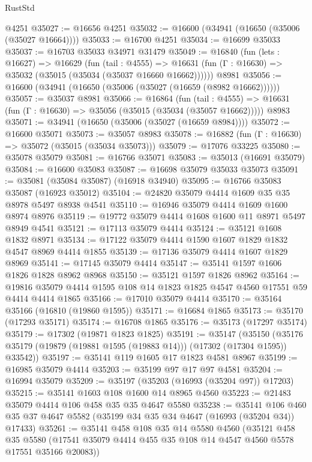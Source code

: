 \begin{lexlean}{RustStd}
\begin{coremodule}
{\begin{coremodule}
{{{{{{{{{{{{{{{{{{{{{{{{{{{{{{{{{{{{{{{{{{{{{{{{{{{{{{{    @4251
@35027 := @16656 @4251
@35032 := @16600 (@34941 (@16650 (@35006 (@35027 @16664))))
@35033 := @16700 @4251
@35034 := @16699 @35033
@35037 := @16703 @35033 @34971 @31479
@35049 := @16840
    (fun (lets : @16627) =>
    @16629
      (fun (tail : @4555) =>
      @16631 (fun (Γ : @16630) => @35032 (@35015 (@35034 (@35037 @16660 @16662))))))
    @8981
@35056 := @16600 (@34941 (@16650 (@35006 (@35027 (@16659 (@8982 @16662))))))
@35057 := @35037 @8981
@35066 := @16864
    (fun (tail : @4555) => @16631 (fun (Γ : @16630) => @35056 (@35015 (@35034 (@35057 @16662)))))
    @8983
@35071 := @34941 (@16650 (@35006 (@35027 (@16659 @8984))))
@35072 := @16600 @35071
@35073 := @35057 @8983
@35078 := @16882 (fun (Γ : @16630) => @35072 (@35015 (@35034 @35073)))
@35079 := @17076 @33225
@35080 := @35078 @35079
@35081 := @16766 @35071
@35083 := @35013 (@16691 @35079)
@35084 := @16600 @35083
@35087 := @16698 @35079 @35033 @35073
@35091 := @35081 (@35084 @35087) (@16918 @34940)
@35095 := @16766 @35083 @35087 (@16923 @35012)
@35104 := @24820 @35079 @4414 @1609 @35 @35 @8978 @5497 @8938 @4541
@35110 := @16946 @35079 @4414 @1609 @1600 @8974 @8976
@35119 := @19772 @35079 @4414 @1608 @1600 @11 @8971 @5497 @8949 @4541
@35121 := @17113 @35079 @4414
@35124 := @35121 @1608 @1832 @8971
@35134 := @17122 @35079 @4414 @1590 @1607 @1829 @1832 @4547 @8969 @4414 @1855
@35139 := @17136 @35079 @4414 @1607 @1829 @8969
@35141 := @17145 @35079 @4414
@35147 := @35141 @1597 @1606 @1826 @1828 @8962 @8968
@35150 := @35121 @1597 @1826 @8962
@35164 := @19816 @35079 @4414 @1595 @108 @14 @1823 @1825 @4547 @4560 @17551 @59 @4414 @4414 @1865
@35166 := @17010 @35079 @4414
@35170 := @35164 @35166 (@16810 (@19860 @1595))
@35171 := @16684 @1865
@35173 := @35170 (@17293 @35171)
@35174 := @16708 @1865
@35176 := @35173 (@17297 @35174)
@35179 := @17302 (@19871 @1823 @1825)
@35191 := @35147
    (@35150 (@35176 @35179 (@19879 (@19881 @1595 (@19883 @14))) (@17302 (@17304 @1595)) @33542))
@35197 := @35141 @119 @1605 @17 @1823 @4581 @8967
@35199 := @16985 @35079 @4414
@35203 := @35199 @97 @17 @97 @4581
@35204 := @16994 @35079
@35209 := @35197 (@35203 (@16993 (@35204 @97)) @17203)
@35215 := @35141 @1603 @108 @1600 @14 @8965 @4560
@35223 := @21483 @35079 @4414 @106 @458 @35 @35 @4647 @5580
@35238 := @35141
    @106
    @460
    @35
    @37
    @4647
    @5582
    (@35199 @34 @35 @34 @4647 (@16993 (@35204 @34)) @17433)
@35261 := @35141
    @458
    @108
    @35
    @14
    @5580
    @4560
    (@35121
      @458
      @35
      @5580
      (@17541 @35079 @4414 @455 @35 @108 @14 @4547 @4560 @5578 @17551 @35166 @20083))
}}}}}}}}}}}}}}}}}}}}}}}}}}}}}}}}}}}}}}}}}}}}}}}}}}}}}}}
\end{coremodule}}
\end{coremodule}
\end{lexlean}
